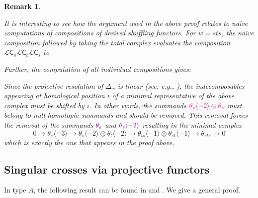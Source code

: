 \documentclass[a4paper]{amsart}
\newtheorem{remark}[theorem]{Remark}
\begin{document}
\begin{remark}\label{rem6.1.4}
{\rm
It is interesting to see how the argument used in the above proof relates to
na{\"\i}ve computations of compositions of derived shuffling functors.
For $w=sts$, the na{\"\i}ve composition followed by taking the total complex
evaluates the composition $\mathcal{L}\mathsf{C}_s\mathcal{L}\mathsf{C}_t\mathcal{L}\mathsf{C}_s$ to 


Further, the computation of all individual compositions gives:


Since the projective resolution of $\Delta_w$ is linear (see, e.g., \cite[Corollary~2.8]{Ma}), 
the indecomposables appearing 
at homological position $i$ of a minimal representative of the above complex must be shifted 
by $i$. In other words, the summands ${\color{magenta}\theta_s\langle -2\rangle\oplus\theta_s}$
must belong to null-homotopic summands and should be removed. This removal forces the removal of
the summands ${\color{violet}\theta_s}$ and ${\color{violet}\theta_s\langle -2\rangle}$ resulting
in the minimal complex
\begin{displaymath}
0\to \theta_e\langle -3\rangle\to
\theta_s\langle -2\rangle\oplus \theta_t\langle -2\rangle
\to
\theta_{ts}\langle -1\rangle\oplus 
\theta_{st}\langle -1\rangle
\to
\theta_{sts}\to 0
\end{displaymath}
which is exactly the one that appears in the proof above.
} 
\end{remark}

\subsection{Singular crosses via projective functors}\label{s6.2}

In type $A$, the following result can be found in \cite[Theorem~1]{MaStr2} and
\cite[Theorem~5.1]{CM}. We give a general proof.
\end{document}
